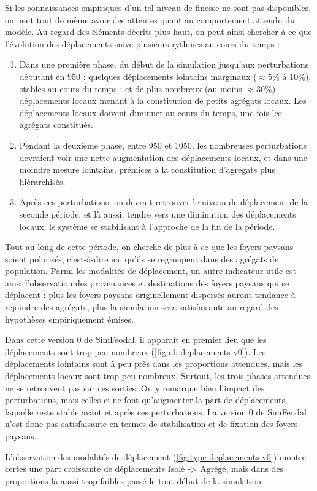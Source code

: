 Si les connaissances empiriques d'un tel niveau de finesse ne sont pas disponibles, on peut tout de même avoir des attentes quant au comportement attendu du modèle.
Au regard des éléments décrits plus haut, on peut ainsi chercher à ce que l'évolution des déplacements suive plusieurs rythmes au cours du temps :
\begin{enumerate}
	\item Dans une première phase, du début de la simulation jusqu'aux perturbations débutant en 950 :
quelques déplacements lointains marginaux ($\approx 5$\% à $10$\%), stables au cours du temps ; et de plus nombreux (au moins $\approx 30$\%) déplacements locaux menant à la constitution de petits agrégats locaux.
		Les déplacements locaux doivent diminuer au cours du temps, une fois les agrégats constitués.
	\item Pendant la deuxième phase, entre 950 et 1050, les nombreuses perturbations devraient voir une nette augmentation des déplacements locaux, et dans une moindre mesure lointains, prémices à la constitution d'agrégats plus hiérarchisés.
	\item Après ces perturbations, on devrait retrouver le niveau de déplacement de la seconde période, et là aussi, tendre vers une diminution des déplacements locaux, le système se stabilisant à l'approche de la fin de la période.
\end{enumerate}

Tout au long de cette période, on cherche de plus à ce que les foyers paysans soient polarisés, c'est-à-dire ici, qu'ils se regroupent dans des agrégats de population.
Parmi les modalités de déplacement, un autre indicateur utile est ainsi l'observation des provenances et destinations des foyers paysans qui se déplacent :
plus les foyers paysans originellement dispersés auront tendance à rejoindre des agrégats, plus la simulation sera satisfaisante au regard des hypothèses empiriquement émises.


\begin{mdframed}[backgroundcolor=gray!10,footnoteinside=false]
Dans cette version 0 de SimFeodal, il apparaît en premier lieu que les déplacements sont trop peu nombreux (\cref{fig:nb-deplacements-v0}).
Les déplacements lointains sont à peu près dans les proportions attendues, mais les déplacements locaux sont trop peu nombreux.
Surtout, les trois phases attendues ne se retrouvent pas sur ces sorties.
On y remarque bien l'impact des perturbations, mais celles-ci ne font qu'augmenter la part de déplacements, laquelle reste stable avant et après ces perturbations.
La version 0 de SimFeodal n'est donc pas satisfaisante en termes de stabilisation et de fixation des foyers paysans.
	
	L'observation des modalités de déplacement (\cref{fig:type-deplacements-v0}) montre certes une part croissante de déplacements \og Isolé -> Agrégé\fg{}, mais dans des proportions là aussi trop faibles passé le tout début de la simulation.
\end{mdframed}


